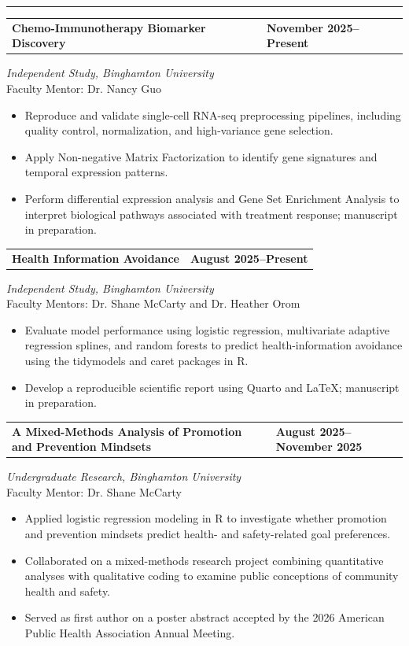 \documentclass[
  9.5pt,
]{article}
\makeatletter
\providecommand{\tightlist}{%
  \setlength{\itemsep}{0pt}\setlength{\parskip}{0pt}}
\newcommand{\cvsection}[1]{\vspace{5pt}{\large\bfseries\color{cvpurple}#1}\vspace{1pt}\hrule\vspace{3pt}}
\newcommand{\cventry}[4]{%
  \begin{tabularx}{\textwidth}{@{}>{\raggedright\arraybackslash}X>{\raggedleft\arraybackslash}p{1.65in}@{}}
  \textbf{#1} & \textbf{#2}\\
  \end{tabularx}
  \textit{#3}\\[-1pt]
  {\small\color{cvpurple}#4}\vspace{-2pt}}
\makeatother
\begin{document}
\cvsection{RESEARCH EXPERIENCE}
\cventry{Chemo-Immunotherapy Biomarker Discovery}{November 2025--Present}{Independent Study, Binghamton University}{Faculty Mentor: Dr. Nancy Guo}

\begin{itemize}
\tightlist
\item
  Reproduce and validate single-cell RNA-seq preprocessing pipelines,
  including quality control, normalization, and high-variance gene
  selection.
\item
  Apply Non-negative Matrix Factorization to identify gene signatures
  and temporal expression patterns.
\item
  Perform differential expression analysis and Gene Set Enrichment
  Analysis to interpret biological pathways associated with treatment
  response; manuscript in preparation.
\end{itemize}

\cventry{Health Information Avoidance}{August 2025--Present}{Independent Study, Binghamton University}{Faculty Mentors: Dr. Shane McCarty and Dr. Heather Orom}

\begin{itemize}
\tightlist
\item
  Evaluate model performance using logistic regression, multivariate
  adaptive regression splines, and random forests to predict
  health-information avoidance using the tidymodels and caret packages
  in R.
\item
  Develop a reproducible scientific report using Quarto and LaTeX;
  manuscript in preparation.
\end{itemize}

\cventry{A Mixed-Methods Analysis of Promotion and Prevention Mindsets}{August 2025--November 2025}{Undergraduate Research, Binghamton University}{Faculty Mentor: Dr. Shane McCarty}

\begin{itemize}
\tightlist
\item
  Applied logistic regression modeling in R to investigate whether
  promotion and prevention mindsets predict health- and safety-related
  goal preferences.
\item
  Collaborated on a mixed-methods research project combining
  quantitative analyses with qualitative coding to examine public
  conceptions of community health and safety.
\item
  Served as first author on a poster abstract accepted by the 2026
  American Public Health Association Annual Meeting.
\end{itemize}
\end{document}
